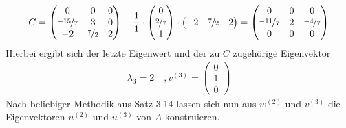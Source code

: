 \begin{egbox}
\begin{align*}
    C = \begin{pmatrix}
    0 & 0 & 0 \\ \nicefrac{-15}{7} & 3 & 0 \\ -2 & \nicefrac{7}{2} & 2
  \end{pmatrix} - \dfrac{1}{1}\cdot \begin{pmatrix}
      0 \\ \nicefrac{2}{7} \\ 1
    \end{pmatrix} \cdot \begin{pmatrix}
      -2 & \nicefrac{7}{2} & 2
    \end{pmatrix} = \left(\begin{matrix}
      0 & 0 & 0 \\
      \nicefrac{-11}{7} & 2 & \nicefrac{-4}{7} \\
      0 & 0 & 0
    \end{matrix}\right)
  \end{align*}
  Hierbei ergibt sich der letzte Eigenwert und der zu $C$ zugehörige Eigenvektor
  \begin{align*}
    \lambda_3=2 \quad, v^{(3)}=\begin{pmatrix}
      0 \\ 1 \\ 0
    \end{pmatrix}
  \end{align*}
  Nach beliebiger Methodik aus Satz 3.14 lassen sich nun aus $w^{(2)}$ und $v^{(3)}$ die Eigenvektoren  $u^{(2)}$
  und $u^{(3)}$ von $A$ konstruieren.
\end{egbox}